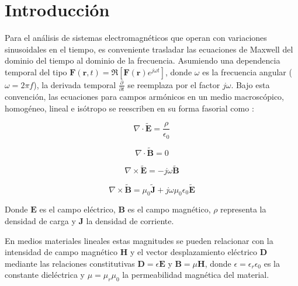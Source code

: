 \documentclass[11pt,a4paper,twoside,pdf]{article}
\numberwithin{equation}{section}
\begin{document}

\tableofcontents


\pagestyle{fancy}
\fancyhead[RO,LE]{\leftmark}
\fancyhead[LO,RE]{\thepage}
\fancyfoot{}



\newpage


\section{Introducción}


Para el análisis de sistemas electromagnéticos que operan con variaciones sinusoidales en el tiempo, es conveniente trasladar las ecuaciones de Maxwell del dominio del tiempo al dominio de la frecuencia. Asumiendo una dependencia temporal del tipo $\mathbf{F}(\mathbf{r}, t) = \mathfrak{R} \left[ \mathbf{F}(\mathbf{r})e^{j\omega t} \right]$, donde  $\omega$ es la frecuencia angular ($\omega = 2\pi f$), la derivada temporal $\frac{\partial}{\partial t}$ se reemplaza por el factor $j\omega$. Bajo esta convención, las ecuaciones para campos armónicos en un medio macroscópico, homogéneo, lineal e isótropo se reescriben en su forma fasorial como \cite{martin2021campo}:

\begin{equation}
\nabla \cdot \tilde{\mathbf{E}} = \frac{\rho}{\epsilon_0} 
\label{leyGauss}
\end{equation}

\begin{equation}
\nabla \cdot \tilde{\mathbf{B}} = 0
\end{equation}

\begin{equation}
\nabla \times \tilde{\mathbf{E}} = -j\omega \tilde{\mathbf{B}}
\label{rotE}
\end{equation}

\begin{equation}
\nabla \times \tilde{\mathbf{B}} = \mu_0\tilde{\mathbf{J}} + j\omega\mu_0\epsilon_0 \tilde{\mathbf{E}}
\label{rotH}
\end{equation}


Donde $\mathbf{E}$ es el campo eléctrico, $\mathbf{B}$ es el campo magnético, $\rho$ representa la densidad de carga y $\mathbf{J}$ la densidad de corriente. 

En medios materiales lineales estas magnitudes se pueden relacionar con la intensidad de campo magnético $\mathbf{H}$ y el vector desplazamiento eléctrico $\mathbf{D}$ mediante las relaciones constitutivas $\mathbf{D} = \epsilon \mathbf{E}$ y $\mathbf{B} = \mu \mathbf{H}$, donde $\epsilon = \epsilon_r \epsilon_0$ es la constante dieléctrica y $\mu = \mu_r \mu_0$ la permeabilidad magnética del material.
\end{document}
